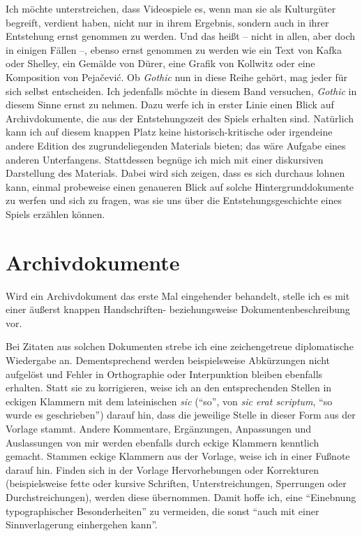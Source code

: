 \documentclass[a5paper,pagesize,numbers=noenddot]{scrbook}
\begin{document}
Ich möchte unterstreichen, dass Videospiele es, wenn man sie als Kulturgüter begreift, verdient haben, nicht nur in ihrem Ergebnis, sondern auch in ihrer Entstehung ernst genommen zu werden.
Und das heißt -- nicht in allen, aber doch in einigen Fällen --, ebenso ernst genommen zu werden wie ein Text von Kafka oder Shelley, ein Gemälde von Dürer, eine Grafik von Kollwitz oder eine Komposition von Pejačević.
Ob \textit{Gothic} nun in diese Reihe gehört, mag jeder für sich selbst entscheiden.
Ich jedenfalls möchte in diesem Band versuchen, \textit{Gothic} in diesem Sinne ernst zu nehmen.
Dazu werfe ich in erster Linie einen Blick auf Archivdokumente, die aus der Entstehungszeit des Spiels erhalten sind.
Natürlich kann ich auf diesem knappen Platz keine historisch-kritische oder irgendeine andere Edition des zugrundeliegenden Materials bieten; das wäre Aufgabe eines anderen Unterfangens.
Stattdessen begnüge ich mich mit einer diskursiven Darstellung des Materials.
Dabei wird sich zeigen, dass es sich durchaus lohnen kann, einmal probeweise einen genaueren Blick auf solche Hintergrunddokumente zu werfen und sich zu fragen, was sie uns über die Entstehungsgeschichte eines Spiels erzählen können.


\section{Archivdokumente}\label{ch:quellen_archivdokumente}
Wird ein Archivdokument das erste Mal eingehender behandelt, stelle ich es mit einer äußerst knappen Handschriften- beziehungsweise Dokumentenbeschreibung vor.

Bei Zitaten aus solchen Dokumenten strebe ich eine zeichengetreue diplomatische Wiedergabe an.
Dementsprechend werden beispielsweise Abkürzungen nicht aufgelöst und Fehler in Orthographie oder Interpunktion bleiben ebenfalls erhalten.
Statt sie zu korrigieren, weise ich an den entsprechenden Stellen in eckigen Klammern mit dem lateinischen \textit{sic} (\enquote{so}, von \textit{sic erat scriptum}, \enquote{so wurde es geschrieben}) darauf hin, dass die jeweilige Stelle in dieser Form aus der Vorlage stammt.
Andere Kommentare, Ergänzungen, Anpassungen und Auslassungen von mir werden ebenfalls durch eckige Klammern kenntlich gemacht.
Stammen eckige Klammern aus der Vorlage, weise ich in einer Fußnote darauf hin.
Finden sich in der Vorlage Hervorhebungen oder Korrekturen (beispielsweise fette oder kursive Schriften, Unterstreichungen, Sperrungen oder Durchstreichungen), werden diese übernommen.
Damit hoffe ich, eine \enquote{Einebnung typographischer Besonderheiten} zu vermeiden, die sonst \enquote{auch mit einer Sinnverlagerung einhergehen kann}.\autocite[S.~21]{plachta_editionswissenschaft_1997}
\end{document}
